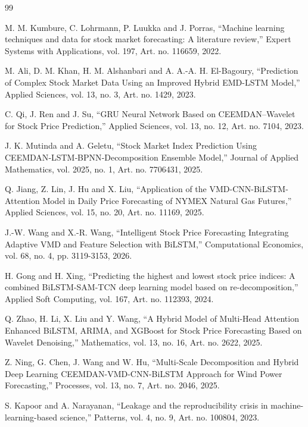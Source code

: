 \documentclass[pdflatex,sn-mathphys-num]{sn-jnl}%
\theoremstyle{thmstyleone}%
\theoremstyle{thmstyletwo}%
\theoremstyle{thmstylethree}%
\begin{document}
\begin{thebibliography}{99}

 M. M. Kumbure, C. Lohrmann, P. Luukka and J. Porras, ``Machine learning techniques and
data for stock market forecasting: A literature review,'' Expert Systems with
Applications, vol. 197, Art. no. 116659, 2022.

 M. Ali, D. M. Khan, H. M. Alshanbari and A. A.-A. H. El-Bagoury, ``Prediction of
Complex Stock Market Data Using an Improved Hybrid EMD-LSTM Model,'' Applied Sciences,
vol. 13, no. 3, Art. no. 1429, 2023.

 C. Qi, J. Ren and J. Su, ``GRU Neural Network Based on CEEMDAN–Wavelet for Stock Price
Prediction,'' Applied Sciences, vol. 13, no. 12, Art. no. 7104, 2023.

 J. K. Mutinda and A. Geletu, ``Stock Market Index Prediction Using
CEEMDAN‐LSTM‐BPNN‐Decomposition Ensemble Model,'' Journal of Applied Mathematics, vol.
2025, no. 1, Art. no. 7706431, 2025.

 Q. Jiang, Z. Lin, J. Hu and X. Liu, ``Application of the VMD-CNN-BiLSTM-Attention
Model in Daily Price Forecasting of NYMEX Natural Gas Futures,'' Applied Sciences,
vol. 15, no. 20, Art. no. 11169, 2025.

 J.-W. Wang and X.-R. Wang, ``Intelligent Stock Price Forecasting Integrating Adaptive
VMD and Feature Selection with BiLSTM,'' Computational Economics, vol. 68, no. 4, pp.
3119-3153, 2026.

 H. Gong and H. Xing, ``Predicting the highest and lowest stock price indices: A
combined BiLSTM-SAM-TCN deep learning model based on re-decomposition,'' Applied Soft
Computing, vol. 167, Art. no. 112393, 2024.

 Q. Zhao, H. Li, X. Liu and Y. Wang, ``A Hybrid Model of Multi-Head Attention Enhanced
BiLSTM, ARIMA, and XGBoost for Stock Price Forecasting Based on Wavelet Denoising,''
Mathematics, vol. 13, no. 16, Art. no. 2622, 2025.

 Z. Ning, G. Chen, J. Wang and W. Hu, ``Multi-Scale Decomposition and Hybrid Deep
Learning CEEMDAN-VMD-CNN-BiLSTM Approach for Wind Power Forecasting,'' Processes, vol.
13, no. 7, Art. no. 2046, 2025.

 S. Kapoor and A. Narayanan, ``Leakage and the reproducibility crisis in
machine-learning-based science,'' Patterns, vol. 4, no. 9, Art. no. 100804, 2023.


\end{thebibliography}
\end{document}
